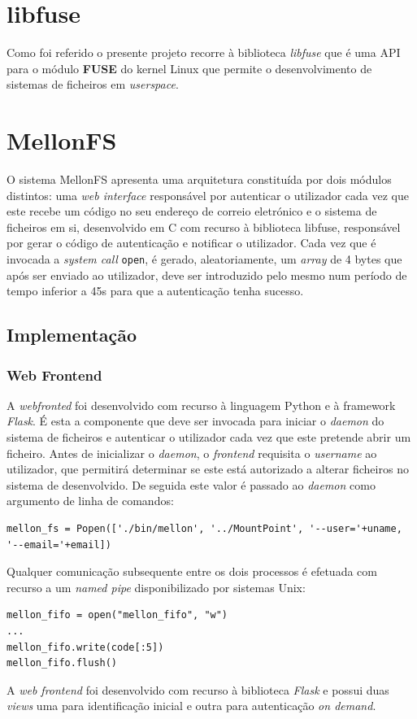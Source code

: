 \documentclass{article}
\begin{document}
\section{libfuse}
Como foi referido o presente projeto recorre à biblioteca \textit{libfuse} que é uma API para o módulo \textbf{FUSE} do kernel Linux que permite o 
desenvolvimento de sistemas de ficheiros em \textit{userspace}.

\section{MellonFS}
O sistema MellonFS apresenta uma arquitetura constituída por dois módulos distintos: uma \textit{web interface} responsável por autenticar o utilizador cada 
vez que este recebe um código no seu endereço de correio eletrónico e o sistema de ficheiros em si, desenvolvido em C com recurso à biblioteca libfuse, 
responsável por gerar o código de autenticação e notificar o utilizador. Cada vez que é invocada a \textit{system call} \texttt{open}, é gerado, aleatoriamente, 
um \textit{array} de 4 bytes que após ser enviado ao utilizador, deve ser introduzido pelo mesmo num período de tempo inferior a 45s para que a autenticação 
tenha sucesso.

\subsection{Implementação}
\subsubsection{Web Frontend}
A \textit{webfronted} foi desenvolvido com recurso à linguagem Python e à framework \textit{Flask}.
É esta a componente que deve ser invocada para iniciar o \textit{daemon} do sistema de ficheiros e autenticar o utilizador cada vez que este pretende abrir um 
ficheiro. Antes de inicializar o \textit{daemon}, o \textit{frontend} requisita o \textit{username} ao utilizador, que permitirá determinar se este está 
autorizado a alterar ficheiros no sistema de desenvolvido. De seguida este valor é passado ao \textit{daemon} como argumento de linha de comandos:
\begin{Verbatim}
mellon_fs = Popen(['./bin/mellon', '../MountPoint', '--user='+uname, '--email='+email])
\end{Verbatim}
Qualquer comunicação subsequente entre os dois processos é efetuada com recurso a um \textit{named pipe} disponibilizado por sistemas Unix: 
\begin{Verbatim}
mellon_fifo = open("mellon_fifo", "w")
...
mellon_fifo.write(code[:5])
mellon_fifo.flush()
\end{Verbatim}
A \textit{web frontend} foi desenvolvido com recurso à biblioteca \textit{Flask} e possui duas \textit{views} uma para identificação inicial e outra para 
autenticação \textit{on demand}.
\end{document}
